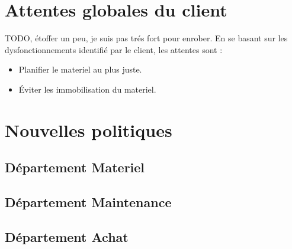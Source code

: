\section{Attentes globales du client}
    {\huge TODO, étoffer un peu, je suis pas trés fort pour enrober.}
    En se basant sur les dysfonctionnements identifié par le client, les attentes sont :
    \begin{itemize}
        \item Planifier le materiel au plus juste.
        \item \'Eviter les immobilisation du materiel.
    \end{itemize}

\section{Nouvelles politiques}

    \subsection{Département Materiel}

    \subsection{Département Maintenance}

    \subsection{Département Achat}

